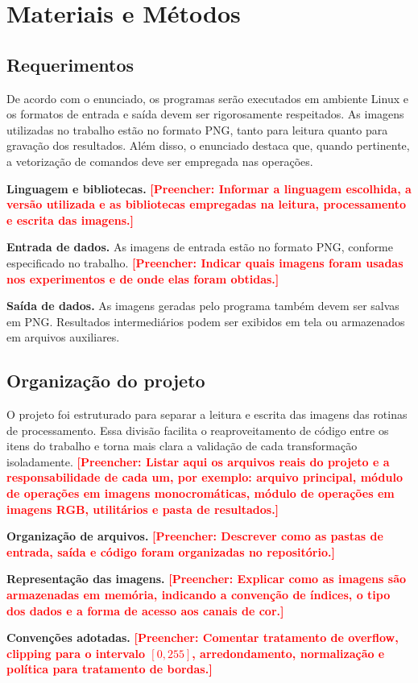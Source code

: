 \documentclass[12pt,a4paper]{article}
\newcommand{\placeholder}[1]{\textcolor{red}{\textbf{[Preencher: #1]}}}
\newcommand{\campo}[2]{\textbf{#1.} #2\par}
\begin{document}
\section{Materiais e Métodos}

\subsection{Requerimentos}

De acordo com o enunciado, os programas serão executados em ambiente Linux e os formatos de entrada e saída devem ser rigorosamente respeitados. As imagens utilizadas no trabalho estão no formato PNG, tanto para leitura quanto para gravação dos resultados. Além disso, o enunciado destaca que, quando pertinente, a vetorização de comandos deve ser empregada nas operações.

\campo{Linguagem e bibliotecas}{\placeholder{Informar a linguagem escolhida, a versão utilizada e as bibliotecas empregadas na leitura, processamento e escrita das imagens.}}
\campo{Entrada de dados}{As imagens de entrada estão no formato PNG, conforme especificado no trabalho. \placeholder{Indicar quais imagens foram usadas nos experimentos e de onde elas foram obtidas.}}
\campo{Saída de dados}{As imagens geradas pelo programa também devem ser salvas em PNG. Resultados intermediários podem ser exibidos em tela ou armazenados em arquivos auxiliares.}

\subsection{Organização do projeto}

O projeto foi estruturado para separar a leitura e escrita das imagens das rotinas de processamento. Essa divisão facilita o reaproveitamento de código entre os itens do trabalho e torna mais clara a validação de cada transformação isoladamente. \placeholder{Listar aqui os arquivos reais do projeto e a responsabilidade de cada um, por exemplo: arquivo principal, módulo de operações em imagens monocromáticas, módulo de operações em imagens RGB, utilitários e pasta de resultados.}

\campo{Organização de arquivos}{\placeholder{Descrever como as pastas de entrada, saída e código foram organizadas no repositório.}}
\campo{Representação das imagens}{\placeholder{Explicar como as imagens são armazenadas em memória, indicando a convenção de índices, o tipo dos dados e a forma de acesso aos canais de cor.}}
\campo{Convenções adotadas}{\placeholder{Comentar tratamento de overflow, clipping para o intervalo $[0,255]$, arredondamento, normalização e política para tratamento de bordas.}}
\end{document}

